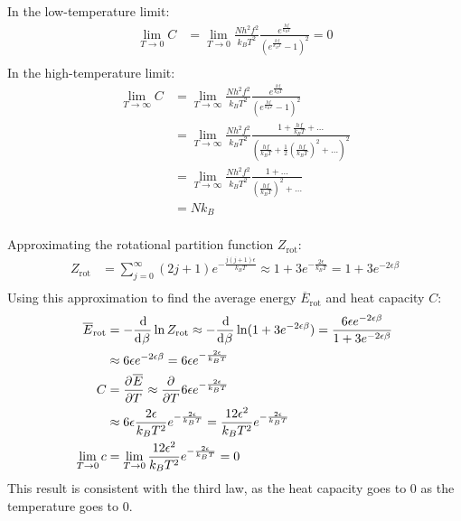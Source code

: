 \documentclass{article}
\begin{document}
In the low-temperature limit:
\begin{equation}
    \begin{split}
        \lim_{T \to 0} C & = \lim_{T \to 0} \frac{Nh^2f^2}{k_BT^2}\frac{e^{\frac{hf}{k_BT}}}{{\left(e^{\frac{hf}{k_BT}} - 1\right)}^2} = 0 \\
    \end{split}
\end{equation}
In the high-temperature limit:
\begin{equation}
    \begin{split}
        \lim_{T \to \infty} C & = \lim_{T \to \infty} \frac{Nh^2f^2}{k_BT^2}\frac{e^{\frac{hf}{k_BT}}}{{\left(e^{\frac{hf}{k_BT}} - 1\right)}^2} \\
        & = \lim_{T \to \infty} \frac{Nh^2f^2}{k_BT^2}\frac{1 + \frac{hf}{k_BT} + \ldots }{{\left(\frac{hf}{k_BT} + \frac{1}{2}{\left(\frac{hf}{k_BT}\right)}^2 + \ldots \right)}^2} \\
        & = \lim_{T \to \infty} \frac{Nh^2f^2}{k_BT^2}\frac{1 + \ldots}{{\left(\frac{hf}{k_BT}\right)}^2 + \ldots} \\
        & = Nk_B \\
    \end{split}
\end{equation}

\clearpage

Approximating the rotational partition function $Z_{\text{rot}}$:
\begin{equation}
    \begin{split}
        Z_{\text{rot}} & = \sum_{j=0}^{\infty} (2j + 1)e^{-\frac{j(j + 1)\epsilon}{k_BT}}  \approx 1 + 3e^{-\frac{2\epsilon}{k_BT}} = 1 + 3e^{-2\epsilon\beta} \\
    \end{split}
\end{equation}
Using this approximation to find the average energy $\overline{E}_{\text{rot}}$ and heat capacity $C$:
\begin{equation}
    \begin{split}
        \overline{E}_{\text{rot}} & = -\deriv{}{\beta}\ln Z_{\text{rot}} \approx -\deriv{}{\beta}\ln(1 + 3e^{-2\epsilon\beta}) = \frac{6\epsilon e^{-2\epsilon\beta}}{1 + 3e^{-2\epsilon\beta}} \\
        & \approx 6\epsilon e^{-2\epsilon\beta} = 6\epsilon e^{-\frac{2\epsilon}{k_BT}} \\
        C & = \pderiv{\overline{E}}{T} \approx \pderiv{}{T} 6\epsilon e^{-\frac{2\epsilon}{k_BT}} \\
        & \approx 6\epsilon \frac{2\epsilon}{k_BT^2}e^{-\frac{2\epsilon}{k_BT}} = \frac{12\epsilon^2}{k_BT^2}e^{-\frac{2\epsilon}{k_BT}} \\
        \lim_{T\to 0} c & = \lim_{T \to 0} \frac{12\epsilon^2}{k_BT^2}e^{-\frac{2\epsilon}{k_BT}} = 0
    \end{split}
\end{equation}
This result is consistent with the third law, as the heat capacity goes to $0$ as the temperature goes to $0$.
\end{document}
